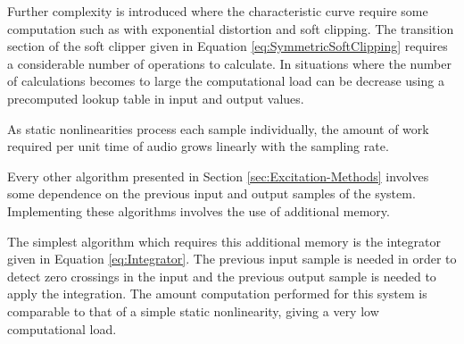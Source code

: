 		Further complexity is introduced where the characteristic curve require some computation such as with
		exponential distortion and soft clipping. The transition section of the soft clipper given in Equation
		\ref{eq:SymmetricSoftClipping} requires a considerable number of operations to calculate. In situations
		where the number of calculations becomes to large the computational load can be decrease using a
		precomputed lookup table in input and output values.

		As static nonlinearities process each sample individually, the amount of work required per unit time of
		audio grows linearly with the sampling rate.

		Every other algorithm presented in Section \ref{sec:Excitation-Methods} involves some dependence on the
		previous input and output samples of the system. Implementing these algorithms involves the use of
		additional memory.

		The simplest algorithm which requires this additional memory is the integrator given in Equation
		\ref{eq:Integrator}. The previous input sample is needed in order to detect zero crossings in the input and
		the previous output sample is needed to apply the integration. The amount computation performed for this
		system is comparable to that of a simple static nonlinearity, giving a very low computational load.

%			


